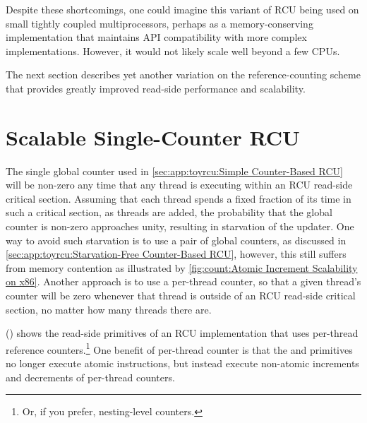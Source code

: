 Despite these shortcomings, one could imagine this variant
of RCU being used on small tightly coupled multiprocessors,
perhaps as a memory-conserving implementation that maintains
API compatibility with more complex implementations.
However, it would not likely scale well beyond a few CPUs.

The next section describes yet another variation on the reference-counting
scheme that provides greatly improved read-side performance and scalability.

\section{Scalable Single-Counter RCU}
\label{sec:app:toyrcu:Scalable Single-Counter RCU}

The single global counter used in
\cref{sec:app:toyrcu:Simple Counter-Based RCU}
will be non-zero any time that any thread is executing within
an RCU read-side critical section.
Assuming that each thread spends a fixed fraction of its time in
such a critical section, as threads are added, the probability
that the global counter is non-zero approaches unity, resulting
in starvation of the updater.
One way to avoid such starvation is to use a pair of global counters,
as discussed in
\cref{sec:app:toyrcu:Starvation-Free Counter-Based RCU},
however, this still suffers from memory contention as illustrated by
\cref{fig:count:Atomic Increment Scalability on x86}.
Another approach is to use a per-thread counter, so that a given thread's
counter will be zero whenever that thread is outside of an RCU read-side
critical section, no matter how many threads there are.

()
shows the read-side primitives of an RCU implementation that uses per-thread
reference counters.\footnote{
	Or, if you prefer, nesting-level counters.}
One benefit of per-thread  counter is that the
 and  primitives no longer
execute atomic instructions, but instead execute non-atomic increments
and decrements of per-thread counters.

\begin{listing}

\caption{RCU Per-Thread Reference-Count Data}
\label{lst:app:toyrcu:RCU Per-Thread Reference-Count Data}
\end{listing}

\begin{listing}

\caption{RCU Read-Side Using Per-Thread Reference-Count}
\label{lst:app:toyrcu:RCU Read-Side Using Per-Thread Reference-Count}
\end{listing}

